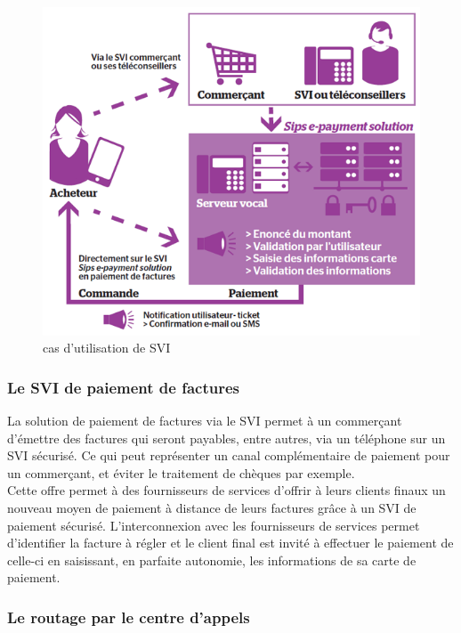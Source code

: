 \begin{figure}[!htbp]
  \centering
    \includegraphics[scale=0.4]{images/SVI}
  \caption{cas d’utilisation de SVI}
\end{figure}


\subsubsection{Le SVI de paiement de factures}

La solution de paiement de factures via le SVI permet à un commerçant d’émettre des factures qui seront payables, entre autres, via un téléphone sur un SVI sécurisé. Ce qui peut représenter un canal complémentaire de paiement pour un commerçant, et éviter le traitement de chèques par exemple.\\

Cette offre permet à des fournisseurs de services d’offrir à leurs clients finaux un nouveau moyen de paiement à distance de leurs factures grâce à un SVI de paiement sécurisé. L’interconnexion avec les fournisseurs de services permet d’identifier la facture à régler et le client final est invité à effectuer le paiement de celle-ci en saisissant, en parfaite autonomie, les informations de sa carte de paiement.

\subsubsection{Le routage par le centre d'appels} 


